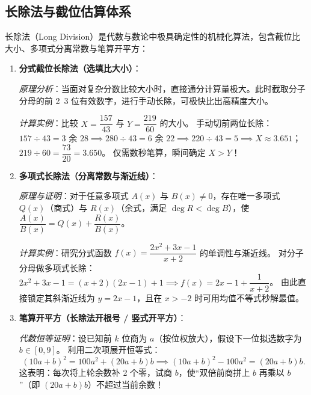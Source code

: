 \documentclass[12pt,a4paper]{ctexart}
\begin{document}
\subsection{长除法与截位估算体系}
长除法（Long Division）是代数与数论中极具确定性的机械化算法，包含截位比大小、多项式分离常数与笔算开平方：

\begin{enumerate}[label=\arabic*. , leftmargin=2em, itemsep=1.2em, topsep=0.2em]
  \item \textbf{分式截位长除法（选填比大小）}：
  
  \textit{原理分析}：当面对复杂分数比较大小时，直接通分计算量极大。此时截取分子分母的前 2~3 位有效数字，进行手动长除，可极快比出高精度大小。
  
  \textit{计算实例}：比较 \(X = \dfrac{157}{43}\) 与 \(Y = \dfrac{219}{60}\) 的大小。
  手动切前两位长除：
  \(157 \div 43 = 3\) 余 \(28 \implies 280 \div 43 = 6\) 余 \(22 \implies 220 \div 43 = 5 \implies X \approx 3.651\)；
  \(219 \div 60 = \dfrac{73}{20} = 3.650\)。
  仅需数秒笔算，瞬间确定 \(X > Y\)！

  \item \textbf{多项式长除法（分离常数与渐近线）}：
  
  \textit{原理与证明}：对于任意多项式 \(A(x)\) 与 \(B(x) \neq 0\)，存在唯一多项式 \(Q(x)\)（商式）与 \(R(x)\)（余式，满足 \(\deg R < \deg B\)），使 \(\dfrac{A(x)}{B(x)} = Q(x) + \dfrac{R(x)}{B(x)}\)。
  
  \textit{计算实例}：研究分式函数 \(f(x) = \dfrac{2x^2 + 3x - 1}{x + 2}\) 的单调性与渐近线。
  对分子分母做多项式长除：
  \(2x^2 + 3x - 1 = (x+2)(2x-1) + 1 \implies f(x) = 2x - 1 + \dfrac{1}{x+2}\)。
  由此直接锁定其斜渐近线为 \(y = 2x - 1\)，且在 \(x > -2\) 时可用均值不等式秒解最值。

  \item \textbf{笔算开平方（长除法开根号 / 竖式开平方）}：
  
  \textit{代数恒等证明}：设已知前 \(k\) 位商为 \(a\)（按位权放大），假设下一位拟选数字为 \(b \in [0, 9]\)。
  利用二次项展开恒等式：
  \[
  (10a + b)^2 = 100a^2 + (20a + b)b \implies (10a + b)^2 - 100a^2 = (20a + b)b.
  \]
  这表明：每次将上轮余数补 2 个零，试商 \(b\)，使“双倍前商拼上 \(b\) 再乘以 \(b\)”（即 \((20a+b)b\)）不超过当前余数！
  

\end{enumerate}
\end{document}
